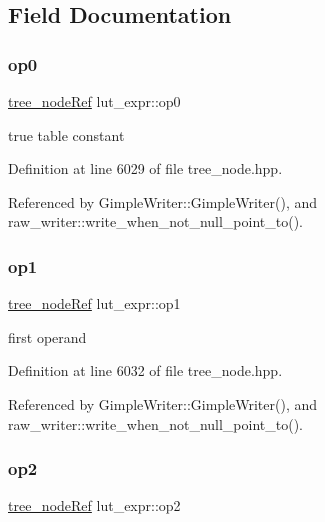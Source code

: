 \subsection{Field Documentation}
\mbox{\label{structlut__expr_a80904213ead2871b46575145ad0a8778}} 
\subsubsection{\texorpdfstring{op0}{op0}}
{\footnotesize\ttfamily \hyperlink{tree__node_8hpp_a6ee377554d1c4871ad66a337eaa67fd5}{tree\+\_\+node\+Ref} lut\+\_\+expr\+::op0}



true table constant 



Definition at line 6029 of file tree\+\_\+node.\+hpp.



Referenced by Gimple\+Writer\+::\+Gimple\+Writer(), and raw\+\_\+writer\+::write\+\_\+when\+\_\+not\+\_\+null\+\_\+point\+\_\+to().

\mbox{\label{structlut__expr_abc9d7a29fe5b04264b9d50c5fe05b0a8}} 
\subsubsection{\texorpdfstring{op1}{op1}}
{\footnotesize\ttfamily \hyperlink{tree__node_8hpp_a6ee377554d1c4871ad66a337eaa67fd5}{tree\+\_\+node\+Ref} lut\+\_\+expr\+::op1}



first operand 



Definition at line 6032 of file tree\+\_\+node.\+hpp.



Referenced by Gimple\+Writer\+::\+Gimple\+Writer(), and raw\+\_\+writer\+::write\+\_\+when\+\_\+not\+\_\+null\+\_\+point\+\_\+to().

\mbox{\label{structlut__expr_a86b215b0e37067c784c029321be9a917}} 
\subsubsection{\texorpdfstring{op2}{op2}}
{\footnotesize\ttfamily \hyperlink{tree__node_8hpp_a6ee377554d1c4871ad66a337eaa67fd5}{tree\+\_\+node\+Ref} lut\+\_\+expr\+::op2}



